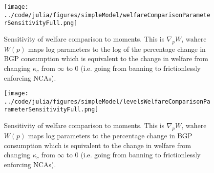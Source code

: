 \documentclass[11pt,english]{article}
\theoremstyle{remark}
\begin{document}
\begin{figure}[]
	\texttt{[image: ../code/julia/figures/simpleModel/welfareComparisonParameterSensitivityFull.png]}
	\caption{Sensitivity of welfare comparison to moments. This is $\nabla_p W$, wahere $W(p)$ maps log parameters to the log of the percentage change in BGP consumption which is equivalent to the change in welfare from changing $\kappa_c$ from $\infty$ to $0$ (i.e. going from banning to frictionlessly enforcing NCAs).}
	\label{welfareComparisonParameterSensitivityFull}
\end{figure}

\begin{figure}[]
	\texttt{[image: ../code/julia/figures/simpleModel/levelsWelfareComparisonParameterSensitivityFull.png]}
	\caption{Sensitivity of welfare comparison to moments. This is $\nabla_p W$, wahere $W(p)$ maps log parameters to the percentage change in BGP consumption which is equivalent to the change in welfare from changing $\kappa_c$ from $\infty$ to $0$ (i.e. going from banning to frictionlessly enforcing NCAs).}
	\label{levelsWelfareComparisonParameterSensitivityFull}
\end{figure}
\end{document}
